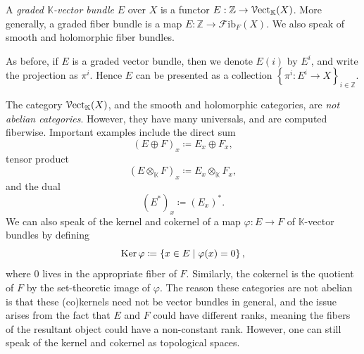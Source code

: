 \begin{definition}\label{dfn:4.1.10}
	A \emph{graded $\mathbb{K} $-vector bundle} $E$ over $X$ is a functor $E : \mathbb{Z}  \to \mathcal{V}\mathrm{ect}_{\mathbb{K} } (X)$. More generally, a graded fiber bundle is a map $E : \mathbb{Z}  \to \mathcal{F} \mathrm{ib}_F(X)$. We also  speak of smooth and holomorphic fiber bundles.
\end{definition}
\begin{notation}
	As before, if $E$ is a graded vector bundle, then we denote $E(i)$ by $E^i$, and write the projection as $\pi ^i$. Hence $E$ can be presented as a collection $\left\{ \pi ^i : E^i \to X \right\}_{i\in\mathbb{Z} } $.
\end{notation}
\begin{discussion}\label{4.1.11}
	The category $\mathcal{V}\mathrm{ect}_{\mathbb{K} } (X)$, and the smooth and holomorphic categories, are \emph{not abelian categories}. However, they have many universals, and are computed fiberwise. Important examples include the direct sum
	\[
		(E\oplus F)_x \coloneqq E_x \oplus F_x,
	\]
	tensor product
	\[
		(E\otimes_\mathbb{K} F)_x \coloneqq E_x \otimes _\mathbb{K} F_x,
	\]
	and the dual
	\[
		(E^*)_x \coloneqq (E_x)^*
	.\]
	We can also speak of the kernel and cokernel of a map $\varphi : E \to F$ of $\mathbb{K} $-vector bundles by defining
	\[
		\operatorname{Ker} \varphi \coloneqq \left\{ x\in E \mid \varphi (x) = 0 \right\} ,
	\]
	where $0$ lives in the appropriate fiber of $F$. Similarly, the cokernel is the quotient of $F$ by the set-theoretic image of $\varphi $. The reason these categories are not abelian is that these (co)kernels need not be vector bundles in general, and the issue arises from the fact that $E$ and $F$ could have different ranks, meaning the fibers of the resultant object could have a non-constant rank. However, one can still speak of the kernel and cokernel as topological spaces.
\end{discussion}

